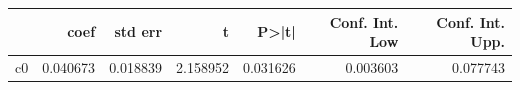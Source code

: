 \begin{tabular}{lrrrrrr}
\toprule
 & coef & std err & t & P>|t| & Conf. Int. Low & Conf. Int. Upp. \\
\midrule
c0 & 0.040673 & 0.018839 & 2.158952 & 0.031626 & 0.003603 & 0.077743 \\
\bottomrule
\end{tabular}